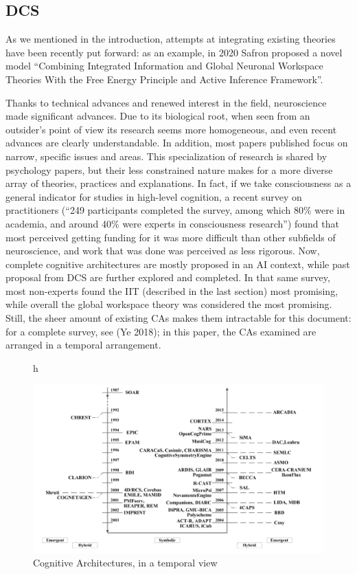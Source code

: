 \documentclass[../main.tex]{subfiles}
\begin{document}
\subsection{DCS}
As we mentioned in the introduction, attempts at integrating existing theories have been recently put forward: as an example, in 2020 Safron proposed a novel model ``Combining Integrated Information and Global Neuronal Workspace Theories With the Free Energy Principle and Active Inference Framework''\cite{safronIntegratedWorldModeling2020}.


Thanks to technical advances and renewed interest in the field, neuroscience made significant advances. Due to its biological root, when seen from an outsider's point of view its research seems more homogeneous, and even recent advances are clearly understandable. In addition, most papers published focus on narrow, specific issues and areas. This specialization of research is shared by psychology papers, but their less constrained nature makes for a more diverse array of theories, practices and explanations. In fact, if we take consciousness as a general indicator for studies in high-level cognition, a recent survey\cite{michelInformalInternetSurvey2018} on practitioners (``249 participants completed the survey, among which 80\% were in academia, and around 40\% were experts in consciousness research'') found that most perceived getting funding for it was more difficult than other subfields of neuroscience, and work that was done was perceived as less rigorous. Now, complete cognitive architectures are mostly proposed in an AI context, while past proposal from DCS are further explored and completed. In that same survey, most non-experts found the IIT (described in the last section) most promising, while overall the global workspace theory was considered the most promising. Still, the sheer amount of existing CAs makes them intractable for this document: for a complete survey, see (Ye 2018)\cite{yeSurveyCognitiveArchitectures2018}; in this paper, the CAs examined are arranged in a temporal arrangement.

\begin{figure}{h}
    \caption{Cognitive Architectures, in a temporal view\cite{yeSurveyCognitiveArchitectures2018} }
    \includegraphics[width=\textwidth]{img/CAs.png}
\end{figure}
\end{document}
